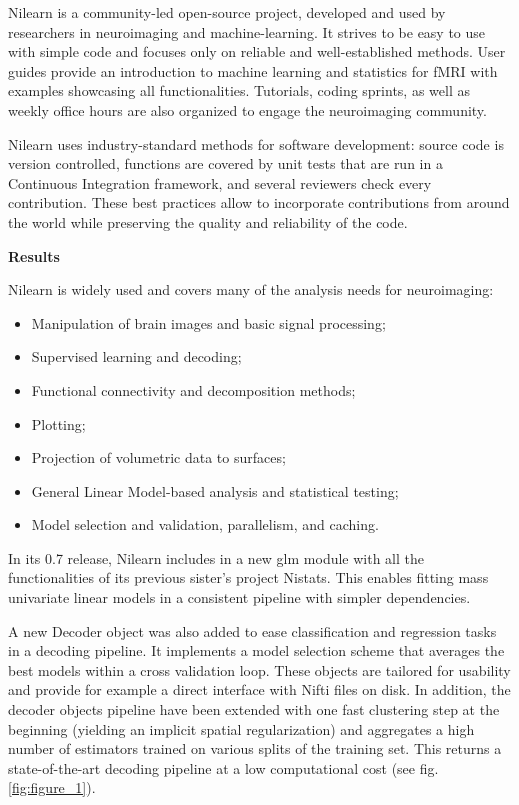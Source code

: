 \documentclass[a4paper]{article}
\begin{document}
\noindent Nilearn is a community-led open-source project, developed and used by researchers in neuroimaging and machine-learning. It strives to be easy to use with simple code and focuses only on reliable and well-established methods. User guides provide an introduction to machine learning and statistics for fMRI with examples showcasing all functionalities. Tutorials, coding sprints, as well as weekly office hours are also organized to engage the neuroimaging community.

\medskip

\noindent Nilearn uses industry-standard methods for software development: source code is version controlled, functions are covered by unit tests that are run in a Continuous Integration framework, and several reviewers check every contribution. These best practices allow to incorporate contributions from around the world while preserving the quality and reliability of the code.

\bigskip

\noindent \textbf{Results}

\medskip

\noindent Nilearn is widely used and covers many of the analysis needs for neuroimaging:

\begin{itemize}
	\item Manipulation of brain images and basic signal processing;
	\item Supervised learning and decoding;
	\item Functional connectivity and decomposition methods;
	\item Plotting;
	\item Projection of volumetric data to surfaces;
	\item General Linear Model-based analysis and statistical testing;
	\item Model selection and validation, parallelism, and caching.
\end{itemize}

\noindent In its 0.7 release, Nilearn includes in a new glm module with all the functionalities of its previous sister’s project Nistats. This enables fitting mass univariate linear models in a consistent pipeline with simpler dependencies.

\medskip

\noindent A new Decoder object was also added to ease classification and regression tasks in a decoding pipeline. It implements a model selection scheme that averages the best models within a cross validation loop. These objects are tailored for usability and provide for example a direct interface with Nifti files on disk. In addition, the decoder objects pipeline have been extended with one fast clustering step at the beginning (yielding an implicit spatial regularization) and aggregates a high number of estimators trained on various splits of the training set. This returns a state-of-the-art decoding pipeline at a low computational cost (see fig. \ref{fig:figure_1}).
\end{document}

